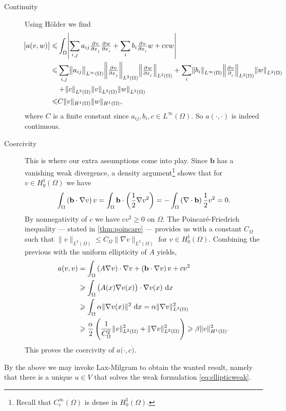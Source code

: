 \documentclass[thesis.tex]{subfiles}
\begin{document}
\begin{description}
  \item[Continuity]Using H\"older we find
    \begin{align*}
      \abs{a(v,w)} \leq &\int_\Omega \abs{\sum_{i,j} a_{ij} \pd{v}{x_j}\pd{w}{x_i}  + \sum_i b_i \pd{v}{x_i}w + cvw}\\
                   \leq &\sum_{i,j} \norm{ a_{ij}}_{L^\infty(\Omega)} \norm{ \pd{v}{x_j}}_{L^2(\Omega)} \norm{ \pd{w}{x_i}}_{L^2(\Omega)} + \sum_i \norm{b_i}_{L^\infty(\Omega)} \norm{\pd{v}{_i}}_{L^2(\Omega)} \norm{w}_{L^2(\Omega)} \\
                   &+ \norm{c}_{L^2(\Omega)} \norm{v}_{L^2(\Omega)} \norm{w}_{L^2(\Omega)} \\
                   \leq &C \|v\|_{H^1(\Omega)} \|w\|_{H^1(\Omega)},
    \end{align*}
    where $C$ is a finite constant since $a_{ij}, b_i, c \in L^\infty(\Omega)$. So $a(\cdot,\cdot)$ is indeed continuous.
  \item[Coercivity] This is where our extra assumptions come into play. Since $\mathbf{b}$ has a vanishing weak divergence, a density argument\footnote{Recall that $C_c^\infty(\Omega)$ is dense in $H_0^1(\Omega)$.} shows that for $v \in H_0^1(\Omega)$ we have
    \[
      \int_\Omega \left(\mathbf{b} \cdot \nabla v\right)v  = \int_\Omega \mathbf{b} \cdot \left({1 \over 2} \nabla v^2\right) = - \int_\Omega \left(\nabla \cdot \mathbf{b} \right) {1 \over 2} v^2 = 0.
    \]
    By nonnegativity of $c$ we have $cv^2 \geq 0$ on $\Omega$. 
    The Poincar\'e-Friedrich  inequality --- stated in \ref{thm:poincare} --- provides us with a constant $C_\Omega$ such that $\|v\|_{L^2(\Omega)} \leq C_\Omega \|\nabla v\|_{L^2(\Omega)}$ for $v \in H_0^1(\Omega)$. Combining the previous with the uniform ellipticity of $A$ yields,
    \begin{align*}
      a(v,v) &= \int_\Omega \left(A \nabla v\right) \cdot \nabla v + \left(\mathbf{b} \cdot \nabla v\right)v + cv^2 \\
             &\geq  \int_\Omega \left(A(x) \nabla v(x)\right) \cdot \nabla v(x)\, \dif x \\
             &\geq  \int_\Omega \alpha \|\nabla v(x)\|^2\, \dif x = \alpha \|\nabla v\|^2_{L^2(\Omega)}\\
             &\geq \frac{\alpha}{2} \left(\frac{1}{C^2_\Omega} \|v\|^2_{L^2(\Omega)} + \|\nabla v\|^2_{L^2(\Omega)}\right) \geq \beta \|v\|^2_{H^1(\Omega)}.
    \end{align*}
    This proves the coercivity of $a(\cdot, c\dot)$.
\end{description}
By the above we may invoke Lax-Milgram to obtain the wanted result, namely that there is a unique $u \in V$ that solves the weak formulation \eqref{eq:ellipticweak}.
\end{document}
